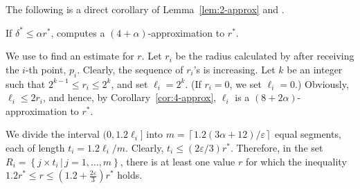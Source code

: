\documentclass[envcountsame]{cls/cccg15}
\newcommand{\set}[1]{\left\{ #1 \right\}}
\newcommand{\ceil}[1]{\left\lceil{#1}\right\rceil}
\newcommand{\provided}{\,|\,}
\newcommand{\lee}{\leqslant}
\newcommand{\gee}{\geqslant}
\renewcommand{\le}{\lee}
\renewcommand{\ge}{\gee}
\newcommand{\eps}{\varepsilon}
\begin{document}
\noindent 
The following is a direct corollary of Lemma~\ref{lem:2-approx} and .

\begin{cor} \label{cor:4-approx}
	If $\delta^* \le \alpha r^*$, 
	 computes a $(4 + \alpha)$-approximation to $r^*$. 
\end{cor}




We use  to find an estimate for $r$. 
Let $r_i$ be the radius calculated by  after receiving
the $i$-th point, $p_i$.
Clearly, the sequence of $r_i$'s is increasing.
Let $k$ be an integer such that $2^{k-1} \le r_i \le 2^{k}$, and set $\ell_i = 2^{k}$.
(If $r_i = 0$, we set $\ell_i = 0$.)
Obviously, $\ell_i \le 2 r_i$,
and hence, by Corollary~\ref{cor:4-approx}, 
$\ell_i$ is a $(8 + 2\alpha)$-approximation to $r^*$.

We divide the interval $(0, 1.2 \ell_i]$ 
into $m=\ceil{{1.2 (3 \alpha+12)}/{\eps}}$ equal segments,
each of length $t_i = 1.2 \ell_i / m$.
Clearly,  $t_i \le (2\eps/3) r^*$.
Therefore, in the set
$R_i = \set{j \times t_i \provided j = 1, \dots, m}$,
there is at least one value $r$ for which the  
inequality $1.2 r^* \le r \le (1.2 + \frac{2\eps}{3})r^*$ holds.

\end{document}
